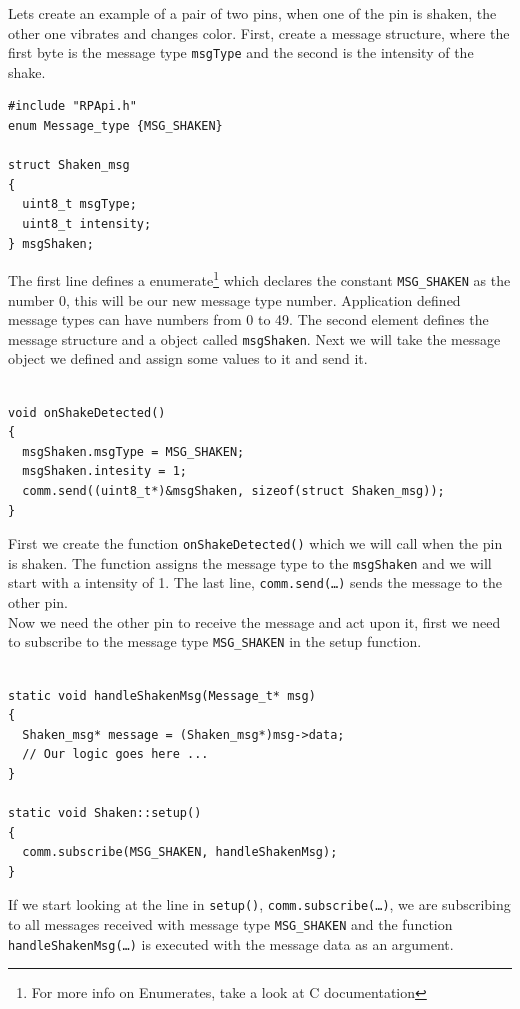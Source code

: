 \documentclass[a4paper, twoside, final]{book}%
\begin{document}
Lets create an example of a pair of two pins, when one of the pin is shaken, the other one vibrates and changes color.
First, create a message structure, where the first byte is the message type \texttt{msgType} and the second is the intensity of the shake.

\begin{lstlisting}
#include "RPApi.h"
enum Message_type {MSG_SHAKEN}

struct Shaken_msg
{
  uint8_t msgType;
  uint8_t intensity;
} msgShaken;
\end{lstlisting}

The first line defines a enumerate\footnote{For more info on Enumerates, take a look at C documentation} which declares the constant \texttt{MSG\_SHAKEN} as the number 0, this 
will be our new message type number. Application defined message types can have numbers from 0 to 49.
The second element defines the message structure and a object called \texttt{msgShaken}.
Next we will take the message object we defined and assign some values to it and send it.

\begin{lstlisting}

void onShakeDetected()
{
  msgShaken.msgType = MSG_SHAKEN;
  msgShaken.intesity = 1;
  comm.send((uint8_t*)&msgShaken, sizeof(struct Shaken_msg));
}
\end{lstlisting}

First we create the function \texttt{onShakeDetected()} which we will call when the pin is shaken. The function assigns the message type to the \texttt{msgShaken} and we will start with a intensity of 1.
The last line, \texttt{comm.send(\dots)} sends the message to the other pin.\\


Now we need the other pin to receive the message and act upon it, first we need to subscribe to the message type \texttt{MSG\_SHAKEN} in the setup function.

\begin{lstlisting}

static void handleShakenMsg(Message_t* msg)
{
  Shaken_msg* message = (Shaken_msg*)msg->data;
  // Our logic goes here ... 
}

static void Shaken::setup()
{
  comm.subscribe(MSG_SHAKEN, handleShakenMsg);
}
\end{lstlisting}

If we start looking at the line in \texttt{setup()}, \texttt{comm.subscribe(\dots)}, we are subscribing to all messages received with message type \texttt{MSG\_SHAKEN} 
and the function \texttt{handleShakenMsg(\dots)} is executed with the message data as an argument.
\end{document}
